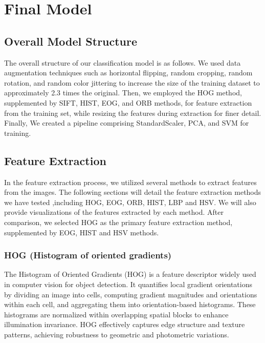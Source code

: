 \documentclass[a4paper,11pt]{article}
\begin{document}
\section{Final Model}

\subsection{Overall Model Structure}
The overall structure of our classification model is as follows. We used data augmentation techniques such as horizontal flipping, random cropping, random rotation, and random color jittering to increase the size of the training dataset to approximately 2.3 times the original. Then, we employed the HOG method, supplemented by SIFT, HIST, EOG, and ORB methods, for feature extraction from the training set, while resizing the features during extraction for finer detail. Finally, We created a pipeline comprising StandardScaler, PCA, and SVM for training.

\subsection{Feature Extraction}

In the feature extraction process, we utilized several methods to extract features from the images. 
The following sections will detail the feature extraction methods we have tested ,including HOG, EOG, ORB, HIST, LBP and HSV. 
We will also provide visualizations of the features extracted by each method.
After comparison, we selected HOG as the primary feature extraction method, supplemented by EOG, HIST and HSV methods.

\subsubsection{HOG (Histogram of oriented gradients)}

The Histogram of Oriented Gradients (HOG) is a feature descriptor widely used in computer vision for object detection. It quantifies local gradient orientations by dividing an image into cells, computing gradient magnitudes and orientations within each cell, and aggregating them into orientation-based histograms. These histograms are normalized within overlapping spatial blocks to enhance illumination invariance. HOG effectively captures edge structure and texture patterns, achieving robustness to geometric and photometric variations.
\end{document}
